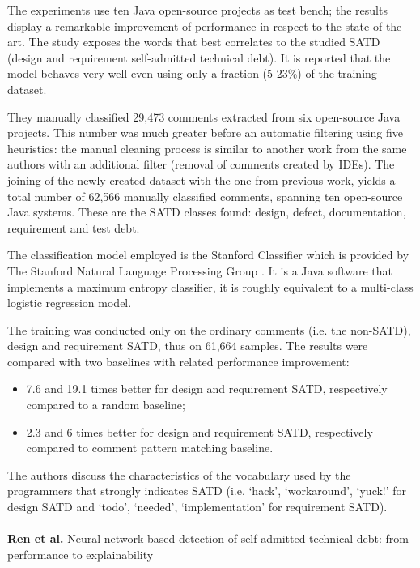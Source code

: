The experiments use ten Java open-source projects as test bench; the results display a remarkable improvement of performance in respect to the state of the art.
The study exposes the words that best correlates to the studied SATD (design and requirement self-admitted technical debt). 
It is reported that the model behaves very well even using only a fraction (5-23\%) of the training dataset.

They manually classified 29,473 comments extracted from six open-source Java projects. This number was much greater before an automatic filtering using five heuristics: the manual cleaning process is similar to another work from the same authors \cite{maldonado2015detecting} with an additional filter (removal of comments created by IDEs).
The joining of the newly created dataset with the one from previous work, yields a total number of 62,566 manually classified comments, spanning ten open-source Java systems. These are the SATD classes found: design, defect, documentation, requirement and test debt. 

The classification model employed is the Stanford Classifier which is provided by The Stanford Natural Language Processing Group \cite{manning2003optimization}. It is a Java software that implements a maximum entropy classifier, it is roughly equivalent to a multi-class logistic regression model.

The training was conducted only on the ordinary comments (i.e. the non-SATD), design and requirement SATD, thus on 61,664 samples.
The results were compared with two baselines with related performance improvement: 
\begin{itemize}
    \item 7.6 and 19.1 times better for design and requirement SATD, respectively compared to a random baseline;
    \item 2.3 and 6 times better for design and requirement SATD, respectively compared to comment pattern matching baseline.
\end{itemize}

The authors discuss the characteristics of the vocabulary used by the programmers that strongly indicates SATD (i.e. `hack', `workaround', `yuck!' for design SATD and `todo', `needed', `implementation' for requirement SATD).
\\
\\
\textbf{Ren et al.} \cite{ren2019neural} Neural network-based detection of self-admitted technical debt: from performance to explainability

